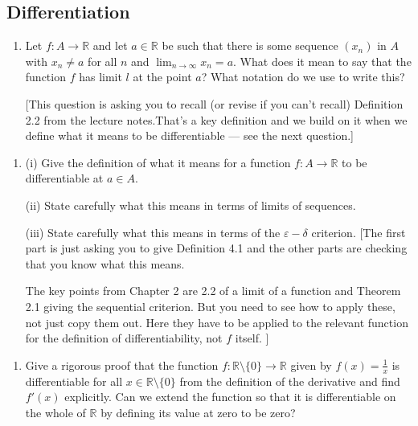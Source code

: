 \documentclass[letterpaper,10pt,english]{jupyterBook}
\begin{document}
\subsection{Differentiation}
\label{\detokenize{Problems:differentiation}}\label{\detokenize{Problems:id37}}\begin{enumerate}
%
\setcounter{enumi}{36}
\item {} 
\sphinxAtStartPar
Let \(f:A\to\mathbb{R}\) and let \(a\in\mathbb{R}\) be such that there is some sequence \((x_n)\) in \(A\) with
\(x_n\neq a\) for all \(n\) and \(\displaystyle\lim_{n\to\infty} x_n=a\). What does it mean to say that
the function \(f\) has limit \(l\) at the point \(a\)? What notation do we use to write this?

{[}This question is asking you to recall (or revise if you can’t recall) Definition 2.2 from the lecture notes.That’s a key definition and we build on it when we define what it means to be differentiable — see the next question.{]}

\end{enumerate}
\label{\detokenize{Problems:id38}}\begin{enumerate}
%
\setcounter{enumi}{37}
\item {} 
\sphinxAtStartPar
(i) Give the definition of what it means for a function \(f:A\to\mathbb{R}\) to be differentiable at \(a \in A\).

\sphinxAtStartPar
(ii) State carefully what this means in terms of limits of sequences.

\sphinxAtStartPar
(iii) State carefully what this means in terms of the \(\varepsilon-\delta\) criterion.
{[}The first part is just asking you to give Definition 4.1 and the other parts are checking that you know what this means.

The key points from Chapter 2 are 2.2 of a limit of a function and Theorem 2.1 giving the sequential criterion. But you need to see how to apply these, not just copy them out. Here they have to be applied to the relevant function for the definition of differentiability, not \(f\) itself. {]}

\end{enumerate}
\label{\detokenize{Problems:id39}}\begin{enumerate}
%
\setcounter{enumi}{38}
\item {} 
\sphinxAtStartPar
Give a rigorous proof that the function \(f:\mathbb{R}\setminus\{0\}\to \mathbb{R}\) given by
\(f(x) = \frac{1}{x}\) is differentiable for all \(x \in \mathbb{R} \setminus \{0\}\) from the definition of the derivative and find \(f'(x)\) explicitly. Can we extend the function so that it is differentiable on the whole of \(\mathbb{R}\) by defining its value at zero to be zero?

\end{enumerate}
\end{document}
